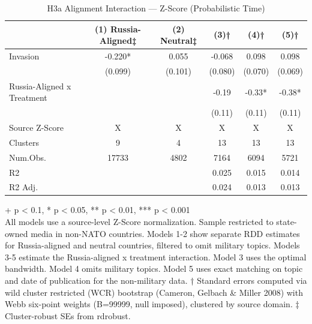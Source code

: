 \begin{table}[t]
\caption{\label{tab:table-04}H3a Alignment Interaction — Z-Score (Probabilistic Time)}
\fontsize{12.0pt}{14.0pt}\selectfont
\begin{tabular*}{\linewidth}{@{\extracolsep{\fill}}lccccc}
\toprule
  & (1) Russia-Aligned‡ & (2) Neutral‡ & (3)† & (4)† & (5)† \\ 
\midrule\addlinespace[2.5pt]
Invasion & -0.220* & 0.055 & -0.068 & 0.098 & 0.098 \\ 
 & (0.099) & (0.101) & (0.080) & (0.070) & (0.069) \\ 
Russia-Aligned x Treatment &  &  & -0.19 & -0.33* & -0.38* \\ 
{} & {} & {} & {(0.11)} & {(0.11)} & {(0.11)} \\ 
Source Z-Score & X & X & X & X & X \\ 
Clusters & 9 & 4 & 13 & 13 & 13 \\ 
Num.Obs. & 17733 & 4802 & 7164 & 6094 & 5721 \\ 
R2 &  &  & 0.025 & 0.015 & 0.014 \\ 
R2 Adj. &  &  & 0.024 & 0.013 & 0.013 \\ 
\bottomrule
\end{tabular*}
\begin{minipage}{\linewidth}
\vspace{.05em}
+ p < 0.1, * p < 0.05, ** p < 0.01, *** p < 0.001\\
All models use a source-level Z-Score normalization. Sample restricted to
state-owned media in non-NATO countries. Models 1-2 show separate RDD estimates
for Russia-aligned and neutral countries, filtered to omit military topics.
Models 3-5 estimate the Russia-aligned x treatment interaction. Model 3 uses the
optimal bandwidth. Model 4 omits military topics. Model 5 uses exact matching
on topic and date of publication for the non-military data. † Standard errors
computed via wild cluster restricted (WCR) bootstrap (Cameron, Gelbach \& Miller
2008) with Webb six-point weights (B=99999, null imposed), clustered by source
domain. ‡ Cluster-robust SEs from rdrobust.\\
\end{minipage}
\end{table}


